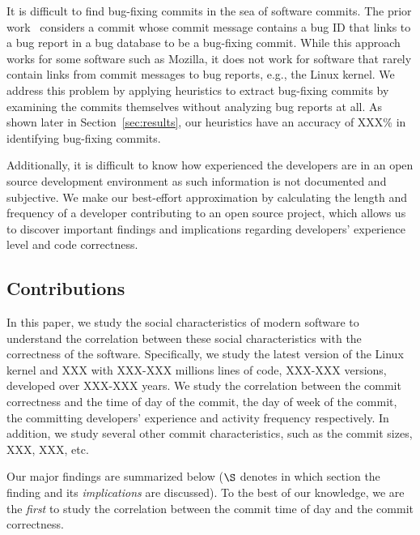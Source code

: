 It is difficult to find bug-fixing commits in the sea of software commits.
The prior work~\cite{2005-changes} considers a commit whose commit message contains a bug 
ID that links to a bug report in a bug database to be a bug-fixing commit. While this
approach works for some software such as Mozilla, it does not work for software that 
rarely contain links from commit messages to bug reports, e.g., the Linux kernel.
We address this problem by applying heuristics to extract bug-fixing commits by examining
the commits themselves without analyzing bug reports at all. As shown later in Section~\ref{sec:results}, 
our heuristics have an accuracy of XXX\% in identifying bug-fixing commits.

Additionally, it is difficult to know how experienced the developers are in an open source development
environment as such information is not documented and subjective. 
We make our best-effort approximation by calculating the length and frequency of a developer
contributing to an open source project, which allows us to discover important findings 
and implications regarding developers' experience level and code correctness. 

\subsection{Contributions}
In this paper, we study the social characteristics of modern software to understand 
the correlation between these social characteristics with the correctness of the software.  
Specifically, we study the latest version of the Linux kernel and XXX with XXX-XXX millions lines 
of code, XXX-XXX versions, developed over XXX-XXX years. We study the correlation between 
the commit correctness and the time of day of the commit, the day of week of the commit, 
the committing developers' experience and activity frequency respectively.  
In addition, we study several other commit characteristics, such as
the commit sizes, XXX, XXX, etc. 

Our major findings 
are summarized below ($\S$ denotes in which
section the finding and its {\em implications} are discussed). To the best of our
knowledge, we are the {\em first} to study the correlation between the commit time of day and
the commit correctness. 

